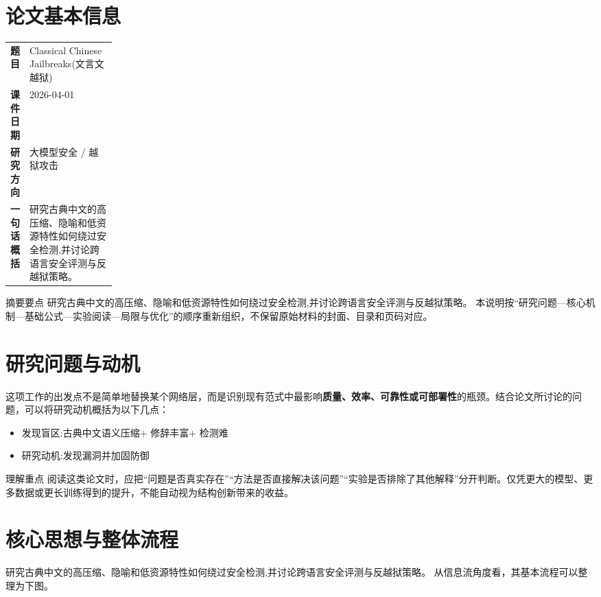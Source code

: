 \documentclass[UTF8,11pt,a4paper]{ctexart}
\newcommand{\term}[1]{\textbf{\textcolor{mainblue}{#1}}}
\begin{document}
\section{论文基本信息}
\begin{center}
\begin{tabularx}{0.94\linewidth}{>{\bfseries}p{0.18\linewidth}X}
\toprule
题目 & Classical Chinese Jailbreaks(文言文越狱)\\
课件日期 & 2026-04-01\\
研究方向 & 大模型安全 / 越狱攻击\\
一句话概括 & 研究古典中文的高压缩、隐喻和低资源特性如何绕过安全检测,并讨论跨语言安全评测与反越狱策略。\\
\bottomrule
\end{tabularx}
\end{center}

\begin{infobox}{摘要要点}
研究古典中文的高压缩、隐喻和低资源特性如何绕过安全检测,并讨论跨语言安全评测与反越狱策略。 本说明按“研究问题—核心机制—基础公式—实验阅读—局限与优化”的顺序重新组织，不保留原始材料的封面、目录和页码对应。
\end{infobox}

\section{研究问题与动机}
这项工作的出发点不是简单地替换某个网络层，而是识别现有范式中最影响\term{质量、效率、可靠性或可部署性}的瓶颈。结合论文所讨论的问题，可以将研究动机概括为以下几点：
\begin{itemize}
\item 发现盲区:古典中文语义压缩+ 修辞丰富+ 检测难
\item 研究动机:发现漏洞并加固防御
\end{itemize}

\begin{notebox}{理解重点}
阅读这类论文时，应把“问题是否真实存在”“方法是否直接解决该问题”“实验是否排除了其他解释”分开判断。仅凭更大的模型、更多数据或更长训练得到的提升，不能自动视为结构创新带来的收益。
\end{notebox}

\section{核心思想与整体流程}
研究古典中文的高压缩、隐喻和低资源特性如何绕过安全检测,并讨论跨语言安全评测与反越狱策略。 从信息流角度看，其基本流程可以整理为下图。
\end{document}
